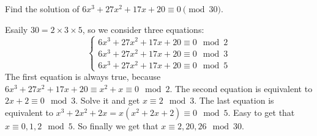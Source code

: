 \documentclass{ctexart}
\newif\ifpreface
\begin{document}
\large
\setlength{\baselineskip}{1.2em}
\ifpreface

\else
{}
\begin{problem}\label{pro:1}
  Find the solution of \(6x^3 + 27 x^2 + 17x + 20 \equiv 0 \pmod{ 30}\).
\end{problem}
\begin{solution}
  Esaily \(30=2\times3\times5\), so we consider three equations:
  \[
    \begin{cases}
      6x^3 + 27 x^2 + 17x + 20 \equiv 0 \mod 2 \\
      6x^3 + 27 x^2 + 17x + 20 \equiv 0 \mod 3 \\
      6x^3 + 27 x^2 + 17x + 20 \equiv 0 \mod 5
    \end{cases}
  \]
  The first equation is always true, because \(6x^3 + 27 x^2 + 17x + 20 \equiv x^2+x \equiv 0 \mod 2\).
  The second equation is equivalent to \(2x+2 \equiv 0 \mod 3\). Solve it and get \(x \equiv 2 \mod 3\).
  The last equation is equivalent to \(x^3+2x^2+2x =x(x^2+2x+2)\equiv 0 \mod 5\).
  Easy to get that \(x \equiv 0,1,2 \mod 5\).
  So finally we get that \(x \equiv 2,20,26 \mod 30\).
\end{solution}
\end{document}
